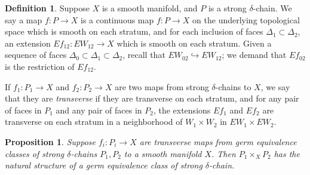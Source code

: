 \documentclass{memo-l}
\newtheorem{lemma}[theorem]{Lemma}
\newtheorem{proposition}[theorem]{Proposition}
\theoremstyle{definition}
\newtheorem{definition}[theorem]{Definition}
\theoremstyle{remark}
\numberwithin{section}{chapter}
\numberwithin{equation}{chapter}
\begin{document}
\begin{definition}Suppose $X$ is a smooth manifold, and $P$ is a strong $\delta$-chain. We say a map $f: P \to X$ is a continuous map $f: P \to X$ on the underlying topological space which is smooth on each stratum, and for each inclusion of faces $\Delta_1 \subset \Delta_2$, an extension $Ef_{12}: EW_{12} \to X$ which is smooth on each stratum. Given a sequence of faces $\Delta_0 \subset \Delta_1 \subset \Delta_2$, recall that $EW_{02} \hookrightarrow EW_{12}$; we demand that $Ef_{02}$ is the restriction of $Ef_{12}$.

If $f_1: P_1 \to X$ and $f_2: P_2 \to X$ are two maps from strong $\delta$-chains to $X$, we say that they are \emph{transverse} if they are transverse on each stratum, and for any pair of faces in $P_1$ and any pair of faces in $P_2$, the extensions $Ef_1$ and $Ef_2$ are transverse on each stratum in a neighborhood of $W_1 \times W_2$ in $EW_1 \times EW_2$.

\end{definition}



\begin{proposition}Suppose $f_i: P_i \to X$ are transverse maps from germ equivalence classes of strong $\delta$-chains $P_1, P_2$ to a smooth manifold $X$. Then $P_1 \times_X P_2$ has the natural structure of a germ equivalence class of strong $\delta$-chain.
\end{proposition}
\end{document}
